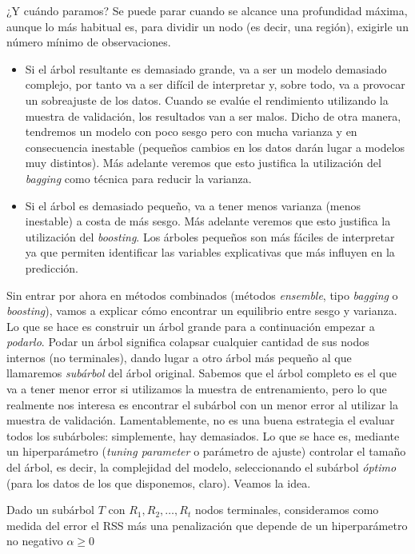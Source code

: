 \documentclass[
  spanish,
]{book}
\theoremstyle{break}
\theoremstyle{definition}
\theoremstyle{definition}
\theoremstyle{definition}
\theoremstyle{remark}
\begin{document}
¿Y cuándo paramos? Se puede parar cuando se alcance una profundidad máxima, aunque lo
más habitual es, para dividir un nodo (es decir, una región), exigirle un número mínimo
de observaciones.

\begin{itemize}
\item
  Si el árbol resultante es demasiado grande, va a ser un modelo demasiado complejo,
  por tanto va a ser difícil de interpretar y, sobre todo,
  va a provocar un sobreajuste de los datos. Cuando se evalúe el rendimiento utilizando
  la muestra de validación, los resultados van a ser malos. Dicho de otra manera, tendremos un
  modelo con poco sesgo pero con mucha varianza y en consecuencia inestable (pequeños
  cambios en los datos darán lugar a modelos muy distintos). Más adelante veremos que esto
  justifica la utilización del \emph{bagging} como técnica para reducir la varianza.
\item
  Si el árbol es demasiado pequeño, va a tener menos varianza (menos inestable) a costa
  de más sesgo. Más adelante veremos que esto justifica la utilización del \emph{boosting}. Los
  árboles pequeños son más fáciles de interpretar ya que permiten identificar las variables
  explicativas que más influyen en la predicción.
\end{itemize}

Sin entrar por ahora en métodos combinados (métodos \emph{ensemble}, tipo \emph{bagging} o \emph{boosting}),
vamos a explicar cómo encontrar un equilibrio entre sesgo y varianza. Lo que se hace es
construir un árbol grande para a continuación empezar a \emph{podarlo}. Podar un árbol significa
colapsar cualquier cantidad de sus nodos internos (no terminales), dando lugar a otro árbol más
pequeño al que llamaremos \emph{subárbol} del árbol original. Sabemos que el árbol completo es
el que va a tener menor error si utilizamos la muestra de entrenamiento, pero lo que
realmente nos interesa es encontrar el subárbol con un menor error al utilizar la muestra
de validación. Lamentablemente, no es una buena estrategia el evaluar todos los subárboles:
simplemente, hay demasiados. Lo que se hace es, mediante un
hiperparámetro (\emph{tuning parameter} o parámetro de ajuste) controlar el tamaño del árbol,
es decir, la complejidad del modelo, seleccionando el subárbol \emph{óptimo} (para los datos
de los que disponemos, claro). Veamos la idea.

Dado un subárbol \(T\) con \(R_1, R_2, \ldots, R_t\) nodos terminales, consideramos como
medida del error el RSS más una penalización que depende de un hiperparámetro
no negativo \(\alpha \ge 0\)
\end{document}
